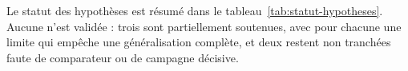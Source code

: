
Le statut des hypothèses est résumé dans le tableau~\ref{tab:statut-hypotheses}. Aucune n'est validée : trois sont partiellement soutenues, avec pour chacune une limite qui empêche une généralisation complète, et deux restent non tranchées faute de comparateur ou de campagne décisive.

